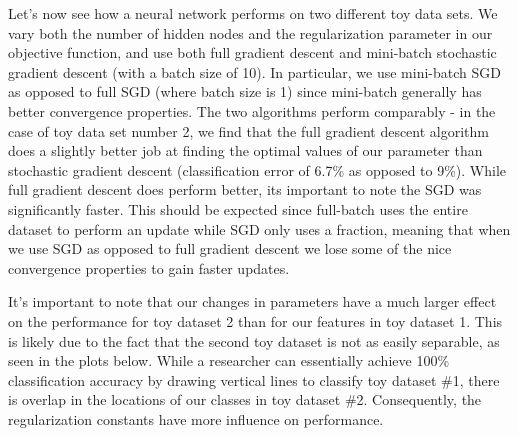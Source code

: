 \documentclass[10pt]{article}
\begin{document}
Let's now see how a neural network performs on two different toy data sets. We vary both the number of hidden nodes and the regularization parameter in our objective function, and use both full gradient descent and mini-batch stochastic gradient descent (with a batch size of 10). In particular, we use mini-batch SGD as opposed to full SGD (where batch size is 1) since mini-batch generally has better convergence properties. The two algorithms perform comparably - in the case of toy data set number 2, we find that the full gradient descent algorithm does a slightly better job at finding the optimal values of our parameter than stochastic gradient descent (classification error of 6.7\% as opposed to 9\%). While full gradient descent does perform better, its important to note the SGD was significantly faster. This should be expected since full-batch uses the entire dataset to perform an update while SGD only uses a fraction, meaning that when we use SGD as opposed to full gradient descent we lose some of the nice convergence properties to gain faster updates. 

It's important to note that our changes in parameters have a much larger effect on the performance for toy dataset 2 than for our features in toy dataset 1. This is likely due to the fact that the second toy dataset is not as easily separable, as seen in the plots below. While a researcher can essentially achieve 100\% classification accuracy by drawing vertical lines to classify toy dataset \#1, there is overlap in the locations of our classes in toy dataset \#2. Consequently, the regularization constants have more influence on performance.
\end{document}
